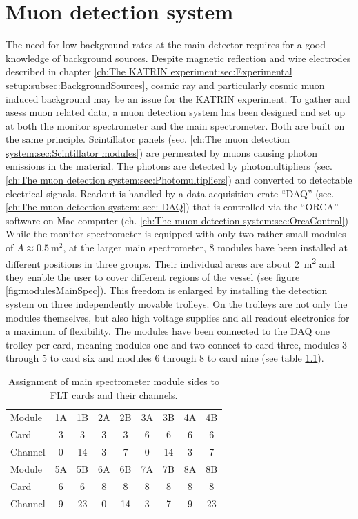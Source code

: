 
\chapter{Muon detection system}
\label{ch:The muon detection system}
  The need for low background rates at the main detector requires for a good knowledge of background sources. Despite magnetic reflection and wire electrodes described in chapter \ref{ch:The KATRIN experiment:sec:Experimental setup:subsec:BackgroundSources}, cosmic ray and particularly cosmic muon induced background may be an issue for the KATRIN experiment. To gather and asess muon related data, a muon detection system has been designed and set up at both the monitor spectrometer and the main spectrometer. Both are built on the same principle. Scintillator panels (sec. \ref{ch:The muon detection system:sec:Scintillator modules}) are permeated by muons causing photon emissions in the material. The photons are detected by photomultipliers (sec. \ref{ch:The muon detection system:sec:Photomultipliers}) and converted to detectable electrical signals. Readout is handled by a data acquisition crate ``DAQ'' (sec. \ref{ch:The muon detection system: sec: DAQ}) that is controlled via the ``ORCA'' software on Mac computer (ch. \ref{ch:The muon detection system:sec:OrcaControl})
  While the monitor spectrometer is equipped with only two rather small modules of $A \approx \SI{0.5}{\square\meter}$, at the larger main spectrometer, 8 modules have been installed at different positions in three groups. Their individual areas are about \SI{2}{\square\meter} and they enable the user to cover different regions of the vessel (see figure \ref{fig:modulesMainSpec}). This freedom is enlarged by installing the detection system on three independently movable trolleys. On the trolleys are not only the modules themselves, but also high voltage supplies and all readout electronics for a maximum of flexibility.
  The modules have been connected to the DAQ one trolley per card, meaning modules one and two connect to card three, modules 3 through 5 to card six and modules 6 through 8 to card nine (see table \ref{tab:connectionsModulesCards}).
  \begin{table}
  	\centering
  	\begin{tabular}{| l | c c | c c | c c | c c |}
  	\hline
  		Module	& 1A	& 1B	& 2A	& 2B	& 3A	& 3B	& 4A	& 4B 	\\
  		Card	& 3	& 3	& 3	& 3	& 6	& 6	& 6	& 6	\\
  		Channel	& 0	& 14	& 3	& 7	& 0	& 14	& 3	& 7	\\
  		\hline \hline
  		Module	&5A	& 5B	& 6A	& 6B	& 7A	& 7B	& 8A	& 8B	\\
  		Card	& 6	& 6	& 8	& 8	& 8	& 8	& 8	& 8	\\
  		Channel	& 9	& 23	& 0	& 14	& 3	& 7	& 9	& 23	\\
  		\hline
  	\end{tabular}
  	\caption[Main spectrometer DAQ channel assignment]{Assignment of main spectrometer module sides to FLT cards and their channels.}
  	\label{tab:connectionsModulesCards}
  \end{table}
